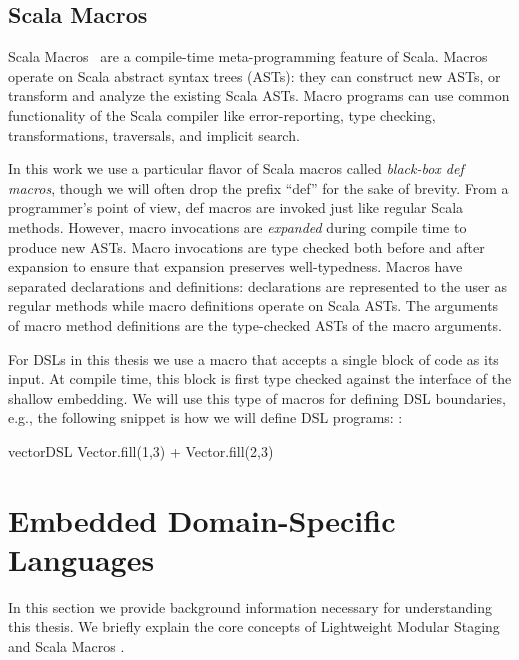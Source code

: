 \subsection{Scala Macros}
\label{sec:scala-macros}

Scala Macros~\cite{burmako_scala_2013} are a compile-time meta-programming
 feature of Scala. Macros operate on Scala abstract syntax trees (ASTs): they
 can construct new ASTs, or transform and analyze the existing Scala ASTs.
 Macro programs can use common functionality of the Scala compiler like
 error-reporting, type checking, transformations, traversals, and implicit
 search.

In this work we use a particular flavor of Scala macros called \emph{black-box def
 macros}, though we will often drop the prefix ``def'' for the
 sake of brevity.  From a programmer's point of view, def macros
 are invoked just like regular Scala methods.  However, macro
 invocations are \emph{expanded} during compile time to produce new
 ASTs.  Macro invocations are type checked both before and after
 expansion to ensure that expansion preserves well-typedness.  Macros
 have separated declarations and definitions: declarations are
 represented to the user as regular methods while macro definitions
 operate on Scala ASTs.  The arguments of macro method definitions are
 the type-checked ASTs of the macro arguments.

For DSLs in this thesis we use a macro that accepts a single block of
 code as its input. At compile time, this block is first type checked
 against the interface of the shallow embedding.  We will use this type of macros
 for defining DSL boundaries, e.g., the following snippet is how we will define DSL
 programs:
:\begin{lstparagraph}
vectorDSL {
  Vector.fill(1,3) + Vector.fill(2,3)
}
\end{lstparagraph}


\section{Embedded Domain-Specific Languages}
\label{sec:embedded-domain-specific-languages}

In this section we provide background information necessary for understanding this
thesis.  We briefly explain the core concepts of Lightweight Modular Staging
\cite{rompf2012lightweight,rompf_optimizing_2013} and Scala Macros
\cite{burmako_scala_2013}.

